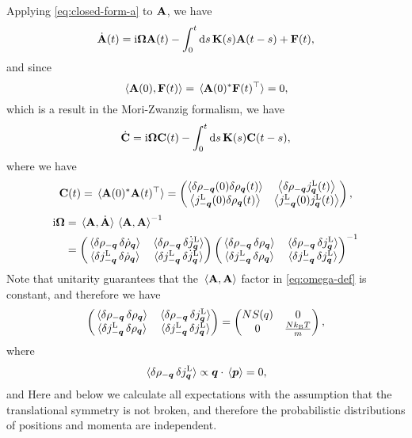 \documentclass[hyperref, a4paper]{article}
\newcommand*{\ii}{\mathrm{i}}
\begin{document}
Applying \eqref{eq:closed-form-a} to $\vb{A}$, we have 
\[
    \dot{\vb{A}}(t)= \ii \vb{\Omega} \vb{A}(t) - \int_{0}^{t} \dd{s} \vb{K}(s) \vb{A}(t-s)+ \vb{F}(t),
\]
and since 
\[
    \expval*{\vb{A}(0), \vb{F}(t)} = \expval*{\vb{A}(0)^* \vb{F}(t)^\top} = 0, 
\]
which is a result in the Mori-Zwanzig formalism, we have 
\begin{equation}
    \dot{\vb{C}} = \ii \vb{\Omega} \vb{C}(t) - \int_{0}^{t} \dd{s} \vb{K}(s) \vb{C}(t-s),
\end{equation}
where we have 
\begin{equation}
    \vb{C}(t) = \expval*{\vb{A}(0)^* \vb{A}(t)^\top} = \pmqty{\left\langle\delta \rho_{-\vb*{q}}(0) \delta \rho_{\vb*{q}}(t)\right\rangle & \left\langle\delta \rho_{-\vb*{q}} j_{\vb*{q}}^\text{L}(t)\right\rangle \\
    \left\langle j_{-\vb*{q}}^\text{L}(0) \delta \rho_{\vb*{q}}(t)\right\rangle & \left\langle j_{-\vb*{q}}^\text{L}(0) j_{\vb*{q}}^\text{L}(t)\right\rangle},
\end{equation}
\begin{equation}
    \begin{aligned}
        \ii \vb{\Omega} &= \expval*{\vb{A}, \dot{\vb{A}}} \expval*{\vb{A}, \vb{A}}^{-1} \\
        &= \pmqty{ 
            \expval*{\var{\rho_{-\vb*{q}}} \var{\dot{\rho}_{\vb*{q}}} } &
            \expval*{\var{\rho_{-\vb*{q}}} \var{\dot{j}^\text{L}_{\vb*{q}}} } \\
            \expval*{\var{j^\text{L}_{-\vb*{q}}} \var{\dot{\rho}_{\vb*{q}}} } &
            \expval*{\var{j^\text{L}_{-\vb*{q}}} \var{\dot{j}^\text{L}_{\vb*{q}}} }} 
        \pmqty{ 
            \expval*{\var{\rho_{-\vb*{q}}} \var{{\rho}_{\vb*{q}}} } &
            \expval*{\var{\rho_{-\vb*{q}}} \var{{j}^\text{L}_{\vb*{q}}} } \\
            \expval*{\var{j^\text{L}_{-\vb*{q}}} \var{{\rho}_{\vb*{q}}} } &
            \expval*{\var{j^\text{L}_{-\vb*{q}}} \var{{j}^\text{L}_{\vb*{q}}} } }^{-1}
    \end{aligned}
    \label{eq:omega-def}
\end{equation}
Note that unitarity guarantees that the $\expval*{\vb{A}, \vb{A}}$ factor in \eqref{eq:omega-def} is constant,
and therefore we have 
\[
    \pmqty{ 
            \expval*{\var{\rho_{-\vb*{q}}} \var{{\rho}_{\vb*{q}}} } &
            \expval*{\var{\rho_{-\vb*{q}}} \var{{j}^\text{L}_{\vb*{q}}} } \\
            \expval*{\var{j^\text{L}_{-\vb*{q}}} \var{{\rho}_{\vb*{q}}} } &
            \expval*{\var{j^\text{L}_{-\vb*{q}}} \var{{j}^\text{L}_{\vb*{q}}} } 
        } = \pmqty{
            N S(q) & 0 \\ 
            0 &  \frac{N k_\text{B} T}{m}
        },
\]
where 
\[
    \expval*{\var{\rho_{-\vb*{q}}} \var{{j}^\text{L}_{\vb*{q}}} } \propto \vb*{q} \cdot \expval*{\vb*{p}}  = 0,
\]
and 
Here and below we calculate all expectations with the assumption that the translational symmetry is not broken,
and therefore the probabilistic distributions of positions and momenta are independent.


 
\end{document}
